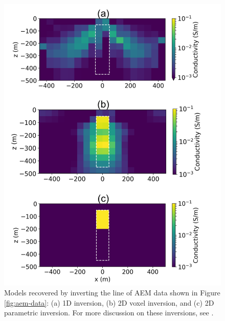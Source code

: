 \begin{figure}
    \begin{center}
    \includegraphics[width=0.55\columnwidth]{figures/aem-inversions.png}
    \end{center}
\caption{
    Models recovered by inverting the line of AEM data shown in Figure \ref{fig:aem-data}:
    (a) 1D inversion, (b) 2D voxel inversion, and (c) 2D parametric inversion. For more discussion
    on these inversions, see \cite{Heagy2018}.
}
\label{fig:aem-inversions}
\end{figure}

